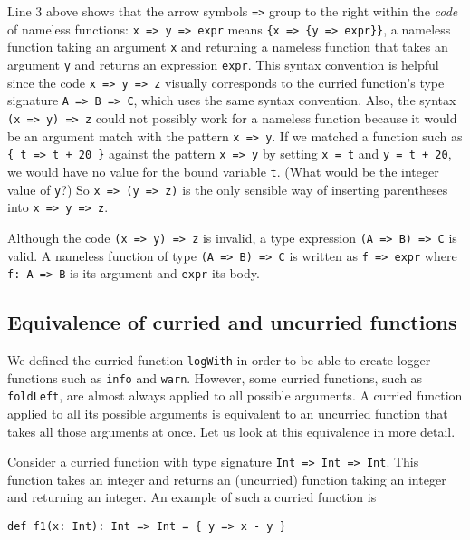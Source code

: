 Line 3 above shows that the arrow symbols \lstinline!=>! group to
the right within the \emph{code} of nameless functions: \lstinline!x => y => expr!
means \lstinline!{x => {y => expr}}!, a nameless function taking
an argument \lstinline!x! and returning a nameless function that
takes an argument \lstinline!y! and returns an expression \lstinline!expr!.
This syntax convention is helpful since the code \lstinline!x => y => z!
visually corresponds to the curried function\textsf{'}s type signature \lstinline!A => B => C!,
which uses the same syntax convention. Also, the syntax \lstinline!(x => y) => z!
could not possibly work for a nameless function because it would be
an argument match with the pattern \lstinline!x => y!. If we matched
a function such as \lstinline!{ t => t + 20 }! against the pattern
\lstinline!x => y! by setting \lstinline!x = t! and \lstinline!y = t + 20!,
we would have no value for the bound variable \lstinline!t!. (What
would be the integer value of \lstinline!y!?) So \lstinline!x => (y => z)!
is the only sensible way of inserting parentheses into \lstinline!x => y => z!.

Although the code \lstinline!(x => y) => z! is invalid, a type expression
\lstinline!(A => B) => C! is valid. A nameless function of type \lstinline!(A => B) => C!
is written as \lstinline!f => expr! where \lstinline!f: A => B!
is its argument and \lstinline!expr! its body. 

\subsection{Equivalence of curried and uncurried functions}

We defined the curried function \lstinline!logWith! in order to be
able to create logger functions such as \lstinline!info! and \lstinline!warn!.
However, some curried functions, such as \lstinline!foldLeft!, are
almost always applied to all possible arguments. A curried function
applied to all its possible arguments is equivalent to an uncurried
function that takes all those arguments at once. Let us look at this
equivalence in more detail.

Consider a curried function with type signature \lstinline!Int => Int => Int!.
This function takes an integer and returns an (uncurried) function
taking an integer and returning an integer. An example of such a curried
function is
\begin{lstlisting}
def f1(x: Int): Int => Int = { y => x - y }
\end{lstlisting}

